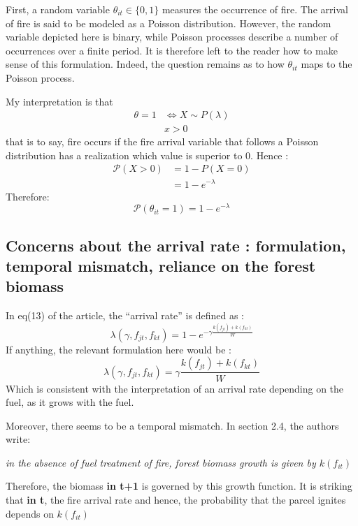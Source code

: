 \documentclass[
]{article}
\begin{document}
First, a random variable \(\theta_{it} \in \{0,1\}\) measures the
occurrence of fire. The arrival of fire is said to be modeled as a
Poisson distribution. However, the random variable depicted here is
binary, while Poisson processes describe a number of occurrences over a
finite period. It is therefore left to the reader how to make sense of
this formulation. Indeed, the question remains as to how \(\theta_{it}\)
maps to the Poisson process.

My interpretation is that \begin{align*}
\theta=1 &\iff X \sim P(\lambda) 
\\
&x>0
\end{align*} that is to say, fire occurs if the fire arrival variable
that follows a Poisson distribution has a realization which value is
superior to 0. Hence : \begin{align*}
    \mathcal{P}(X>0)&=1-P(X=0)\\
    &= 1- e^{-\lambda}
\end{align*} Therefore: \begin{equation}
    \mathcal{P}(\theta_{it}=1)=1-e^{-\lambda}
\end{equation}

\subsection{Concerns about the arrival rate : formulation, temporal mismatch, reliance on the forest biomass}

In eq(13) of the article, the ``arrival rate'' is defined as : \[
\lambda(\gamma, f_{jt},f_{kt})=1-e^{-\gamma\frac{k(f_{jt})+k(f_{kt})}{W}}
\] If anything, the relevant formulation here would be :
\begin{equation*}
    \lambda(\gamma, f_{jt},f_{kt})=\gamma\frac{k(f_{jt})+k(f_{kt})}{W}
\end{equation*} Which is consistent with the interpretation of an
arrival rate depending on the fuel, as it grows with the fuel.

Moreover, there seems to be a temporal mismatch. In section 2.4, the
authors write:

\begin{displayquote}
\textit{in the absence of fuel treatment of fire, forest biomass growth is given by $k(f_{it})$}
\end{displayquote}

Therefore, the biomass \textbf{ in t+1} is governed by this growth
function. It is striking that \textbf{in t}, the fire arrival rate and
hence, the probability that the parcel ignites depends on \(k(f_{it})\)
\end{document}
